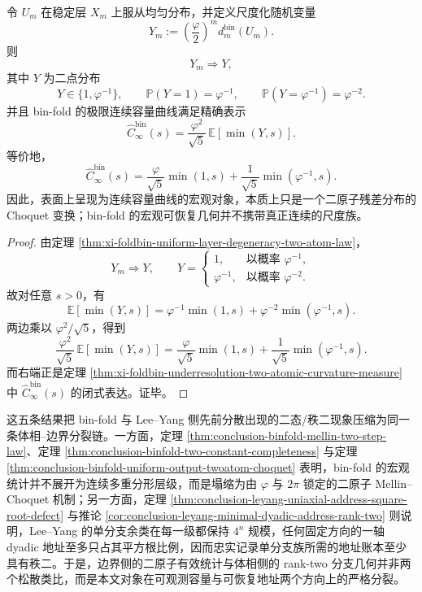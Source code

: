 \begin{theorem}\label{thm:conclusion-binfold-uniform-output-twoatom-choquet}
令 \(U_m\) 在稳定层 \(X_m\) 上服从均匀分布，并定义尺度化随机变量
\[
Y_m:=
\left(\frac{\varphi}{2}\right)^m d_m^{\mathrm{bin}}(U_m).
\]
则
\[
Y_m\Rightarrow Y,
\]
其中 \(Y\) 为二点分布
\[
Y\in\{1,\varphi^{-1}\},
\qquad
\mathbb P(Y=1)=\varphi^{-1},
\qquad
\mathbb P(Y=\varphi^{-1})=\varphi^{-2}.
\]
并且 bin-fold 的极限连续容量曲线满足精确表示
\[
\widehat C_\infty^{\mathrm{bin}}(s)
=
\frac{\varphi^2}{\sqrt5}\,\mathbb E[\min(Y,s)].
\]
等价地，
\[
\widehat C_\infty^{\mathrm{bin}}(s)
=
\frac{\varphi}{\sqrt5}\min(1,s)
+
\frac{1}{\sqrt5}\min(\varphi^{-1},s).
\]
因此，表面上呈现为连续容量曲线的宏观对象，本质上只是一个二原子残差分布的 Choquet 变换；bin-fold 的宏观可恢复几何并不携带真正连续的尺度族。
\end{theorem}
\begin{proof}
由定理 \ref{thm:xi-foldbin-uniform-layer-degeneracy-two-atom-law}，
\[
Y_m\Rightarrow Y,
\qquad
Y=
\begin{cases}
1,& \text{以概率 }\varphi^{-1},\\[4pt]
\varphi^{-1},& \text{以概率 }\varphi^{-2}.
\end{cases}
\]
故对任意 \(s>0\)，有
\[
\mathbb E[\min(Y,s)]
=
\varphi^{-1}\min(1,s)
+
\varphi^{-2}\min(\varphi^{-1},s).
\]
两边乘以 \(\varphi^2/\sqrt5\)，得到
\[
\frac{\varphi^2}{\sqrt5}\,\mathbb E[\min(Y,s)]
=
\frac{\varphi}{\sqrt5}\min(1,s)
+
\frac{1}{\sqrt5}\min(\varphi^{-1},s).
\]
而右端正是定理 \ref{thm:xi-foldbin-underresolution-two-atomic-curvature-measure} 中
\(
\widehat C_\infty^{\mathrm{bin}}(s)
\)
的闭式表达。证毕。
\end{proof}

\noindent
这五条结果把 bin-fold 与 Lee--Yang 侧先前分散出现的二态/秩二现象压缩为同一条体相--边界分裂链。一方面，定理 \ref{thm:conclusion-binfold-mellin-two-step-law}、定理 \ref{thm:conclusion-binfold-two-constant-completeness} 与定理 \ref{thm:conclusion-binfold-uniform-output-twoatom-choquet} 表明，bin-fold 的宏观统计并不展开为连续多重分形层级，而是塌缩为由 \(\varphi\) 与 \(2\pi\) 锁定的二原子 Mellin--Choquet 机制；另一方面，定理 \ref{thm:conclusion-leyang-uniaxial-address-square-root-defect} 与推论 \ref{cor:conclusion-leyang-minimal-dyadic-address-rank-two} 则说明，Lee--Yang 的单分支余类在每一级都保持 \(4^n\) 规模，任何固定方向的一轴 dyadic 地址至多只占其平方根比例，因而忠实记录单分支族所需的地址账本至少具有秩二。于是，边界侧的二原子有效统计与体相侧的 rank-two 分支几何并非两个松散类比，而是本文对象在可观测容量与可恢复地址两个方向上的严格分裂。

\endinput
